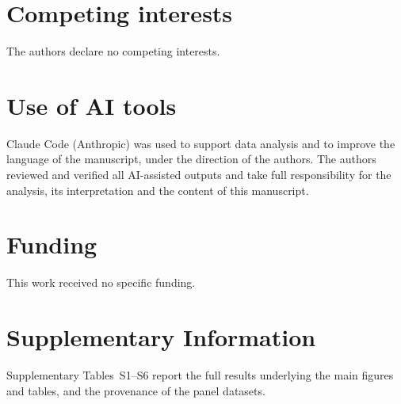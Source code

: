 \documentclass[11pt,letterpaper]{article}
\newcommand{\suppfloats}{%
  \setcounter{table}{0}\renewcommand{\thetable}{S\arabic{table}}%
  \setcounter{figure}{0}\renewcommand{\thefigure}{S\arabic{figure}}}
\begin{document}
\section*{Competing interests}
The authors declare no competing interests.

\section*{Use of AI tools}
Claude Code (Anthropic) was used to support data analysis and to improve the language of the manuscript, under the direction of the authors. The authors reviewed and verified all AI-assisted outputs and take full responsibility for the analysis, its interpretation and the content of this manuscript.

\section*{Funding}
This work received no specific funding.

\renewcommand{\bibfont}{\small}



\clearpage
\suppfloats
\section*{Supplementary Information}

Supplementary Tables~S1--S6 report the full results underlying the main figures and tables, and the provenance of the panel datasets.







\end{document}
